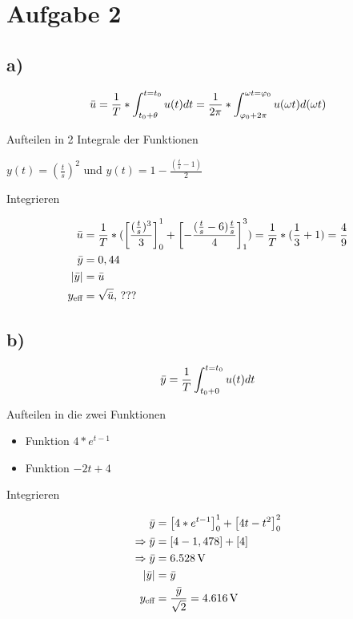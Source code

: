 \documentclass[../../document.tex]{subfiles}
\begin{document}
\section*{Aufgabe 2}

\subsection*{a)}

\begin{equation*}
    \bar{u} = \frac{1}{T} * \int_{t_{\textrm{0}} + \theta}^{t = t_{\textrm{0}}} u(t) dt = \frac{1}{2\pi} * \int_{\varphi_{\textrm{0}} + 2\pi}^{\omega t = \varphi_{\textrm{0}}} u(\omega t) d (\omega t) 
\end{equation*}

Aufteilen in 2 Integrale der Funktionen

\(y(t) = (\frac{t}{s})^2\) und \(y(t) = 1 - \frac{(\frac{t}{s} - 1)}{2}\)

Integrieren

\begin{equation*}
    \begin{split}
        \bar{u} &= \frac{1}{T} * (\left[\frac{(\frac{t}{s})^3}{3}\right]_0^1 + \left[-\frac{(\frac{t}{s}-6)\frac{t}{s}}{4}\right]_1^3) = \frac{1}{T} * (\frac{1}{3} + 1) = \frac{4}{9}\\
        \bar{y} &= 0,44\\
        \left\lvert\bar{y}\right\rvert &= \bar{u} \\
        y_{\textrm{eff}} &= \sqrt{\bar{u}}\text{, ???}\\
    \end{split}
\end{equation*}

\subsection*{b)}

\[\bar{y} = \frac{1}{T} \int_{t_{\textrm{0}} + 0}^{t = t_{\textrm{0}}} u(t) dt\]

Aufteilen in die zwei Funktionen

\begin{itemize}
    \item Funktion \(4 * e^{t - 1}\)
    \item Funktion \(-2t+4\)
\end{itemize}

Integrieren

\begin{equation*}
    \begin{split}
        \bar{y} &= \left[ 4 * e^{t-1} \right]_0^1 + \left[ 4t - t^2 \right]_0^2 \\
        \Rightarrow \bar{y} &= \left[ 4 - 1,478 \right] + \left[ 4 \right]\\
        \Rightarrow \bar{y} &= \SI{6,528}{\volt}\\
        \left\lvert \bar{y} \right\rvert &= \bar{y}\\
        y_{\textrm{eff}} &= \frac{\bar{y}}{\sqrt{2}} = \SI{4,616}{\volt}\\
    \end{split}
\end{equation*}
\end{document}
